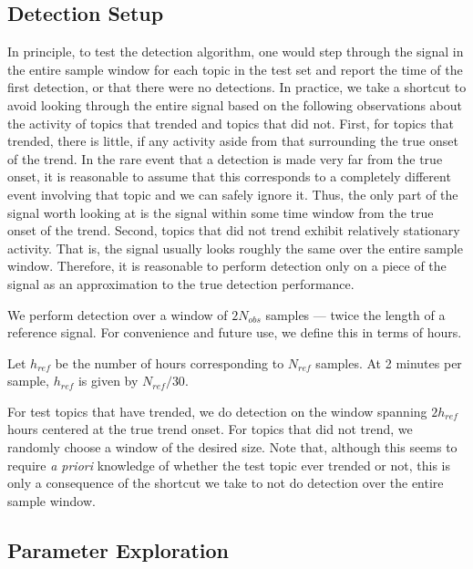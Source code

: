 \subsection{Detection Setup}
In principle, to test the detection algorithm, one would step through the signal
in the entire sample window for each topic in the test set and report the time
of the first detection, or that there were no detections. In practice, we take a
shortcut to avoid looking through the entire signal based on the following
observations about the activity of topics that trended and topics that did
not. First, for topics that trended, there is little, if any activity aside from
that surrounding the true onset of the trend. In the rare event that a detection
is made very far from the true onset, it is reasonable to assume that this
corresponds to a completely different event involving that topic and we can
safely ignore it. Thus, the only part of the signal worth looking at is the
signal within some time window from the true onset of the trend. Second, topics
that did not trend exhibit relatively stationary activity. That is, the signal
usually looks roughly the same over the entire sample window. Therefore, it is
reasonable to perform detection only on a piece of the signal as an
approximation to the true detection performance.

We perform detection over a window of $2N_{obs}$ samples --- twice the length of a
reference signal. For convenience and future use, we define this in terms of hours.

\begin{defn}
Let $h_{ref}$ be the number of hours corresponding to $N_{ref}$ samples. At 2 minutes per sample, $h_{ref}$ is given by $N_{ref} / 30$.
\end{defn}

For test topics that have trended, we do detection on the window spanning
$2h_{ref}$ hours centered at the true trend onset. For topics that did not
trend, we randomly choose a window of the desired size. Note that, although this
seems to require {\em a priori} knowledge of whether the test topic ever trended
or not, this is only a consequence of the shortcut we take to not do detection
over the entire sample window.

\subsection{Parameter Exploration}
